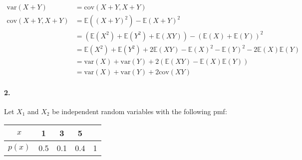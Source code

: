     \begin{mdframed}
        \begin{align*}
            \text{var}(X + Y)           & = \text{cov}(X + Y, X + Y)                                    \\
            \text{cov}(X + Y, X + Y)    & = \mathbb{E}((X + Y)^{2}) - \mathbb{E}(X + Y)^{2}             \\
                                        & = (\mathbb{E}(X^{2}) + \mathbb{E}(Y^{2}) + \mathbb{E}(XY)) - (\mathbb{E}(X) + \mathbb{E}(Y))^{2}                             \\
                                        & = \mathbb{E}(X^{2}) + \mathbb{E}(Y^{2}) + 2\mathbb{E}(XY) -
                                         \mathbb{E}(X)^{2} - \mathbb{E}(Y)^{2} - 
                                         2\mathbb{E}(X)\mathbb{E}(Y)                                    \\
                                        & = \text{var}(X) + \text{var}(Y) + 2(\mathbb{E}(XY) - 
                                        \mathbb{E}(X)\mathbb{E}(Y))                                     \\
                                        & = \text{var}(X) + \text{var}(Y) + 2\text{cov}(XY)
        \end{align*}
    \end{mdframed}

    \paragraph*{2.}
    Let $X_{1}$ and $X_{2}$ be independent random variables with the following pmf:
    \\
    \begin{center}
        \begin{tabular}{c | c c c | c}
            $x$ & 1 & 3 & 5 &   \\
            \hline
            $p(x)$ & 0.5 & 0.1 & 0.4 & 1
        \end{tabular}
    \end{center}

